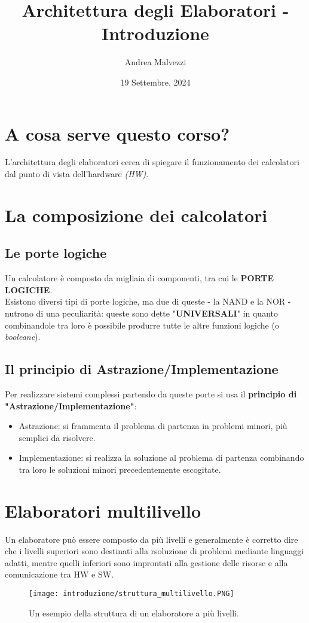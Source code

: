 \documentclass[12pt]{article}
\author{Andrea Malvezzi}
\title{\textbf{Architettura degli Elaboratori - Introduzione}}
\date{19 Settembre, 2024}
\begin{document}
\maketitle
\section*{A cosa serve questo corso?}
L'architettura degli elaboratori cerca di spiegare il funzionamento dei calcolatori dal punto di vista dell'hardware \textit{(HW)}.
\section {La composizione dei calcolatori}
\subsection{Le porte logiche}
Un calcolatore è composto da migliaia di componenti, tra cui le \textbf{PORTE LOGICHE}.\\
Esistono diversi tipi di porte logiche, ma due di queste - la NAND e la NOR - nutrono di una peculiarità: queste sono dette "\textbf{UNIVERSALI}" in quanto combinandole tra loro è possibile produrre tutte le altre funzioni logiche (o \textit{booleane}).
\subsection{Il principio di Astrazione/Implementazione}
Per realizzare sistemi complessi partendo da queste porte si usa il \textbf{principio di "Astrazione/Implementazione"}:
\begin{itemize}
    \item Astrazione: si frammenta il problema di partenza in problemi minori, più semplici da risolvere.
    \item Implementazione: si realizza la soluzione al problema di partenza combinando tra loro le soluzioni minori precedentemente escogitate.
\end{itemize}
\pagebreak
\section{Elaboratori multilivello}
Un elaboratore può essere composto da più livelli e generalmente è corretto dire che i livelli superiori sono destinati alla rsoluzione di problemi mediante linguaggi adatti, mentre quelli inferiori sono improntati alla gestione delle risorse e alla comunicazione tra HW e SW.\\
\begin{figure}[!htb]
    \centering
    \texttt{[image: introduzione/struttura\_multilivello.PNG]}
    \begin{center}
        \caption{Un esempio della struttura di un elaboratore a più livelli.}
    \end{center}
    \label{fig:es_1}
\end{figure}
\end{document}
